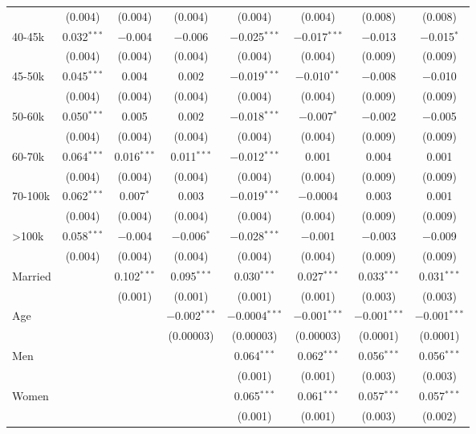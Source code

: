\begin{table}[!htbp]
\begin{tabular}{@{\extracolsep{5pt}}lccccccc}
  & (0.004) & (0.004) & (0.004) & (0.004) & (0.004) & (0.008) & (0.008) \\ 
  40-45k & 0.032$^{***}$ & $-$0.004 & $-$0.006 & $-$0.025$^{***}$ & $-$0.017$^{***}$ & $-$0.013 & $-$0.015$^{*}$ \\ 
  & (0.004) & (0.004) & (0.004) & (0.004) & (0.004) & (0.009) & (0.009) \\ 
  45-50k & 0.045$^{***}$ & 0.004 & 0.002 & $-$0.019$^{***}$ & $-$0.010$^{**}$ & $-$0.008 & $-$0.010 \\ 
  & (0.004) & (0.004) & (0.004) & (0.004) & (0.004) & (0.009) & (0.009) \\ 
  50-60k & 0.050$^{***}$ & 0.005 & 0.002 & $-$0.018$^{***}$ & $-$0.007$^{*}$ & $-$0.002 & $-$0.005 \\ 
  & (0.004) & (0.004) & (0.004) & (0.004) & (0.004) & (0.009) & (0.009) \\ 
  60-70k & 0.064$^{***}$ & 0.016$^{***}$ & 0.011$^{***}$ & $-$0.012$^{***}$ & 0.001 & 0.004 & 0.001 \\ 
  & (0.004) & (0.004) & (0.004) & (0.004) & (0.004) & (0.009) & (0.009) \\ 
  70-100k & 0.062$^{***}$ & 0.007$^{*}$ & 0.003 & $-$0.019$^{***}$ & $-$0.0004 & 0.003 & 0.001 \\ 
  & (0.004) & (0.004) & (0.004) & (0.004) & (0.004) & (0.009) & (0.009) \\ 
  >100k & 0.058$^{***}$ & $-$0.004 & $-$0.006$^{*}$ & $-$0.028$^{***}$ & $-$0.001 & $-$0.003 & $-$0.009 \\ 
  & (0.004) & (0.004) & (0.004) & (0.004) & (0.004) & (0.009) & (0.009) \\ 
  Married &  & 0.102$^{***}$ & 0.095$^{***}$ & 0.030$^{***}$ & 0.027$^{***}$ & 0.033$^{***}$ & 0.031$^{***}$ \\ 
  &  & (0.001) & (0.001) & (0.001) & (0.001) & (0.003) & (0.003) \\ 
  Age &  &  & $-$0.002$^{***}$ & $-$0.0004$^{***}$ & $-$0.001$^{***}$ & $-$0.001$^{***}$ & $-$0.001$^{***}$ \\ 
  &  &  & (0.00003) & (0.00003) & (0.00003) & (0.0001) & (0.0001) \\ 
  Men &  &  &  & 0.064$^{***}$ & 0.062$^{***}$ & 0.056$^{***}$ & 0.056$^{***}$ \\ 
  &  &  &  & (0.001) & (0.001) & (0.003) & (0.003) \\ 
  Women &  &  &  & 0.065$^{***}$ & 0.061$^{***}$ & 0.057$^{***}$ & 0.057$^{***}$ \\ 
  &  &  &  & (0.001) & (0.001) & (0.003) & (0.002) \\ 

\end{tabular}
\end{table}
